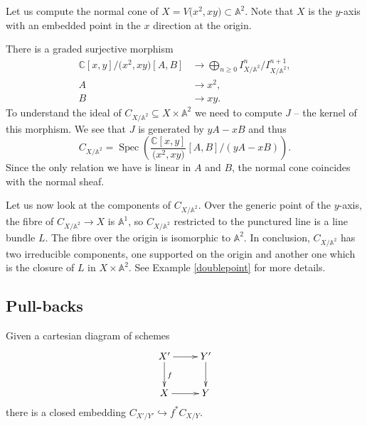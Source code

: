 \documentclass[pdftex]{sigma}
\numberwithin{equation}{section}
\newcommand{\Spec}{\operatorname{Spec}}
\begin{document}
 \begin{Example}\label{dorigin}
Let us compute the normal cone of $X=V\big(x^2,xy\big)\subset\mathbb{A}^2$. Note that $X$ is the $y$-axis with an embedded point in the $x$ direction at the origin.

There is a graded surjective morphism
\begin{align*}
\mathbb{C}[x,y]/\big(x^2,xy\big)[A,B]&\to\bigoplus_{n\geq 0}{ I^n_{X/\mathbb{A}^2}/ I^{n+1}_{X/\mathbb{A}^2} },\\
A &\to x^2,\\
B &\to xy.
\end{align*}
To understand the ideal of $C_{X/\mathbb{A}^2}\subseteq X\times\mathbb{A}^2$ we need to compute $J$ -- the kernel of this morphism.
We see that $J$ is generated by $yA-xB$ and thus
\[
C_{X/\mathbb{A}^2} =\Spec\left( \frac{\mathbb{C}[x,y]}{\big(x^2,xy\big)}[A,B]/(yA-xB) \right).
\]
Since the only relation we have is linear in $A$ and $B$, the normal cone coincides with the normal sheaf.

Let us now look at the components of $C_{X/\mathbb{A}^2}$. Over the generic point of the $y$-axis, the fibre of $C_{X/\mathbb{A}^2}\to X$ is $\mathbb{A}^1$, so $C_{X/\mathbb{A}^2}$ restricted to the punctured line is a line bundle $L$. The fibre over the origin is isomorphic to $\mathbb{A}^2$. In conclusion, $C_{X/\mathbb{A}^2}$ has two irreducible components, one supported on the origin and another one which is the closure of $L$ in $X\times \mathbb{A}^2$. See Example \ref{doublepoint} for more details.
\end{Example}

\subsection{Pull-backs}
Given a cartesian diagram of schemes
\[\xymatrix{X'\ar[r]\ar[d]^f &Y'\ar[d]\\
			X\ar[r] & Y}\]
there is a closed embedding $C_{X'/Y'}\hookrightarrow f^* C_{X/Y}.$
\end{document}
